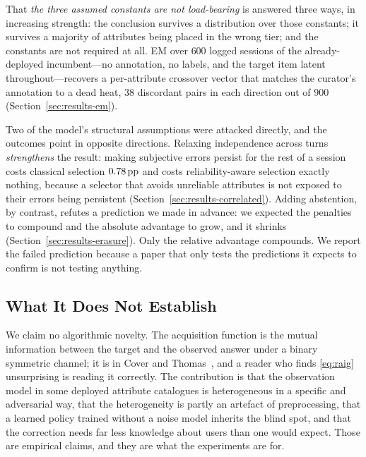 That \emph{the three assumed constants are not load-bearing} is answered three
ways, in increasing strength: the conclusion survives
a distribution over those constants; it survives a majority of attributes being
placed in the wrong tier; and the constants are not required at all. EM over
$600$ logged sessions of the already-deployed incumbent---no annotation, no
labels, and the target item latent throughout---recovers a per-attribute
crossover vector that matches the curator's annotation to a dead heat, $38$
discordant pairs in each direction out of $900$
(Section~\ref{sec:results-em}).

Two of the model's structural assumptions were attacked directly, and the
outcomes point in opposite directions. Relaxing independence across turns
\emph{strengthens} the result: making subjective errors persist for the rest of
a session costs classical selection $0.78\,\text{pp}$ and costs reliability-aware
selection exactly nothing, because a selector that avoids unreliable attributes
is not exposed to their errors being persistent
(Section~\ref{sec:results-correlated}). Adding abstention, by contrast, refutes
a prediction we made in advance: we expected the penalties to compound and the
absolute advantage to grow, and it shrinks
(Section~\ref{sec:results-erasure}). Only the relative advantage compounds. We
report the failed prediction because a paper that only tests the predictions it
expects to confirm is not testing anything.

\subsection{What It Does Not Establish}

We claim no algorithmic novelty. The acquisition function is the mutual
information between the target and the observed answer under a binary symmetric
channel; it is in Cover and Thomas~\cite[Ch.~7]{cover2006}, and a reader who
finds \eqref{eq:raig} unsurprising is reading it correctly. The contribution is
that the observation model in some deployed attribute catalogues is
heterogeneous in a specific and adversarial way, that the heterogeneity is
partly an artefact of preprocessing, that a learned policy trained without a
noise model inherits the blind spot, and that the correction needs far less
knowledge about users than one would expect. Those are empirical claims, and
they are what the experiments are for.

